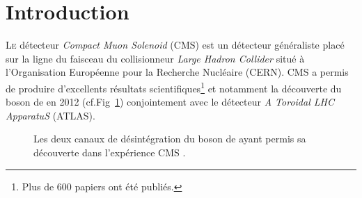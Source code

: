 \chapter*{Introduction}
\renewcommand\chapterillustration{INT/INT}
\ThisULCornerWallPaper{1}{\chapterillustration}

\lettrine[lines=4, slope=-0.5em,nindent=10pt]{L}{e} détecteur \textit{Compact Muon Solenoid} (CMS) est un détecteur généraliste placé sur la ligne du faisceau du collisionneur \textit{Large Hadron Collider} situé à l'Organisation Européenne pour la Recherche Nucléaire (CERN). CMS a permis de produire d'excellents résultats scientifiques\footnote{Plus de \num{600} papiers ont été publiés.} et notamment la découverte du boson de  en \num{2012} (cf.Fig~\ref{higgs}) conjointement avec le détecteur \textit{A Toroidal LHC ApparatuS} (ATLAS). 
\vspace*{-0.4cm}
\begin{figure}[ht!]
	\centering
	\hfill
	\caption{Les deux canaux de désintégration du boson de  ayant permis sa découverte dans l'expérience CMS \cite{Chatrchyan:2012xdj}.}
	\label{higgs}
	\vspace*{-0.3cm}
\end{figure}

